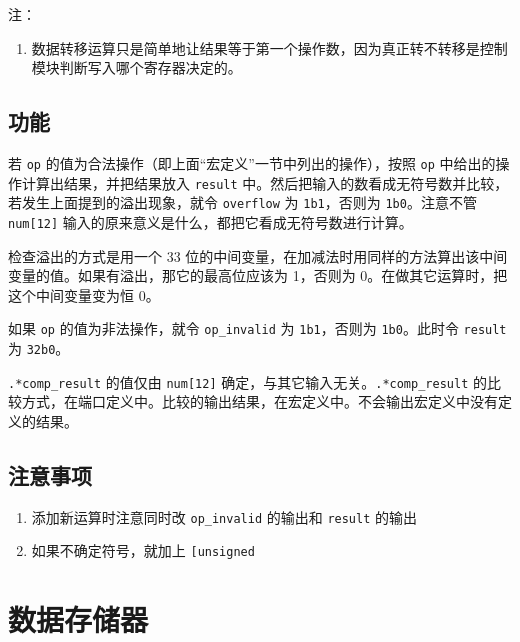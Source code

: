 \documentclass[12pt,AutoFakeBold,AutoFakeSlant]{article}
\providecommand{\tightlist}{%
  \setlength{\itemsep}{0pt}\setlength{\parskip}{0pt}}
\begin{document}
注：

\begin{enumerate}
\def\labelenumi{\arabic{enumi}.}
\tightlist
\item
  数据转移运算只是简单地让结果等于第一个操作数，因为真正转不转移是控制模块判断写入哪个寄存器决定的。
\end{enumerate}

\hypertarget{ux529fux80fd-7}{%
\subsection{功能}\label{ux529fux80fd-7}}

若 \texttt{op} 的值为合法操作（即上面``宏定义''一节中列出的操作），按照
\texttt{op} 中给出的操作计算出结果，并把结果放入 \texttt{result}
中。然后把输入的数看成无符号数并比较，若发生上面提到的溢出现象，就令
\texttt{overflow} 为 \texttt{1\textquotesingle{}b1}，否则为
\texttt{1\textquotesingle{}b0}。注意不管 \texttt{num{[}12{]}}
输入的原来意义是什么，都把它看成无符号数进行计算。

检查溢出的方式是用一个 33
位的中间变量，在加减法时用同样的方法算出该中间变量的值。如果有溢出，那它的最高位应该为
1，否则为 0。在做其它运算时，把这个中间变量变为恒 0。

如果 \texttt{op} 的值为非法操作，就令 \texttt{op\_invalid} 为
\texttt{1\textquotesingle{}b1}，否则为
\texttt{1\textquotesingle{}b0}。此时令 \texttt{result} 为
\texttt{32\textquotesingle{}b0}。

\texttt{.*comp\_result} 的值仅由 \texttt{num{[}12{]}}
确定，与其它输入无关。\texttt{.*comp\_result}
的比较方式，在端口定义中。比较的输出结果，在宏定义中。不会输出宏定义中没有定义的结果。

\hypertarget{ux6ce8ux610fux4e8bux9879-4}{%
\subsection{注意事项}\label{ux6ce8ux610fux4e8bux9879-4}}

\begin{enumerate}
\def\labelenumi{\arabic{enumi}.}
\tightlist
\item
  添加新运算时注意同时改 \texttt{op\_invalid} 的输出和 \texttt{result}
  的输出
\item
  如果不确定符号，就加上 \texttt{{[}un\textbar{}{]}signed}
\end{enumerate}

\hypertarget{ux6570ux636eux5b58ux50a8ux5668}{%
\section{数据存储器}\label{ux6570ux636eux5b58ux50a8ux5668}}
\end{document}

